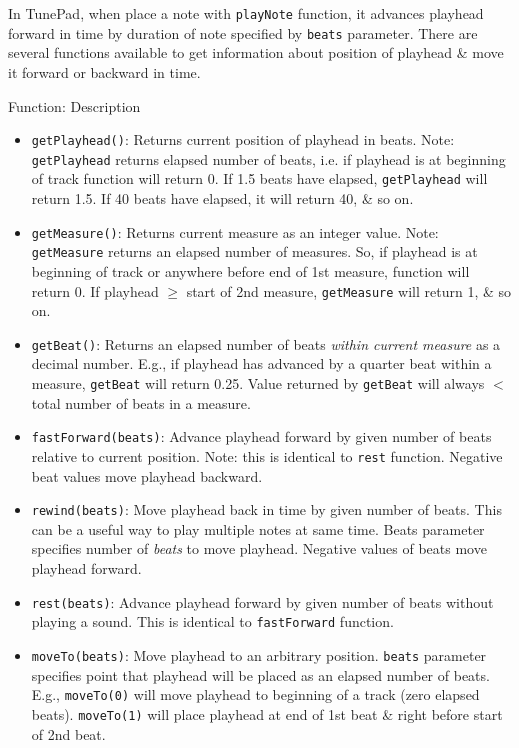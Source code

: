 \documentclass{article}
\begin{document}
\begin{itemize}
\begin{itemize}
		In TunePad, when place a note with {\tt playNote} function, it advances playhead forward in time by duration of note specified by {\tt beats} parameter. There are several functions available to get information about position of playhead \& move it forward or backward in time.
		
		{\sf Function: Description}
		\begin{itemize}
			\item {\tt getPlayhead()}: Returns current position of playhead in beats. Note: {\tt getPlayhead} returns elapsed number of beats, i.e. if playhead is at beginning of track function will return 0. If 1.5 beats have elapsed, {\tt getPlayhead} will return 1.5. If 40 beats have elapsed, it will return 40, \& so on.
			\item {\tt getMeasure()}: Returns current measure as an integer value. Note: {\tt getMeasure} returns an elapsed number of measures. So, if playhead is at beginning of track or anywhere before end of 1st measure, function will return 0. If playhead $\ge$ start of 2nd measure, {\tt getMeasure} will return 1, \& so on.
			\item {\tt getBeat()}: Returns an elapsed number of beats {\it within current measure} as a decimal number. E.g., if playhead has advanced by a quarter beat within a measure, {\tt getBeat} will return 0.25. Value returned by {\tt getBeat} will always $<$ total number of beats in a measure.
			\item {\tt fastForward(beats)}: Advance playhead forward by given number of beats relative to current position. Note: this is identical to {\tt rest} function. Negative beat values move playhead backward.
			\item {\tt rewind(beats)}: Move playhead back in time by given number of beats. This can be a useful way to play multiple notes at same time. Beats parameter specifies number of {\it beats} to move playhead. Negative values of beats move playhead forward.
			\item {\tt rest(beats)}: Advance playhead forward by given number of beats without playing a sound. This is identical to {\tt fastForward} function.
			\item {\tt moveTo(beats)}: Move playhead to an arbitrary position. {\tt beats} parameter specifies point that playhead will be placed as an elapsed number of beats. E.g., {\tt moveTo(0)} will move playhead to beginning of a track (zero elapsed beats). {\tt moveTo(1)} will place playhead at end of 1st beat \& right before start of 2nd beat.
		\end{itemize}

\end{itemize}
\end{itemize}
\end{document}

